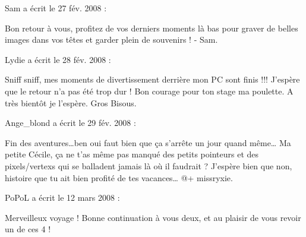 \medskip
Sam a écrit le 27 fév. 2008 :
\begin{displayquote}
Bon retour à vous, profitez de vos derniers moments là bas pour graver de belles images dans vos têtes et garder plein de souvenirs !
- Sam.
\end{displayquote}

\medskip
Lydie a écrit le 28 fév. 2008 :
\begin{displayquote}
Sniff sniff, mes moments de divertissement derrière mon PC sont finis !!!
J'espère que le retour n'a pas été trop dur !
Bon courage pour ton stage ma poulette.
A très bientôt je l'espère.
Gros Bisous.
\end{displayquote}

\medskip
Ange\_blond a écrit le 29 fév. 2008 :
\begin{displayquote}
Fin des aventures\dots ben oui faut bien que ça s'arrête un jour quand même\dots
Ma petite Cécile, ça ne t'as même pas manqué des petits pointeurs et des pixels/vertexs qui se balladent jamais là où il faudrait ?
J'espère bien que non, histoire que tu ait bien profité de tes vacances\dots
@+ missryxie.
\end{displayquote}

\medskip
PoPoL a écrit le 12 mars 2008 :
\begin{displayquote}
Merveilleux voyage ! Bonne continuation à vous deux, et au plaisir de vous revoir un de ces 4 !
\end{displayquote}

\vfill
